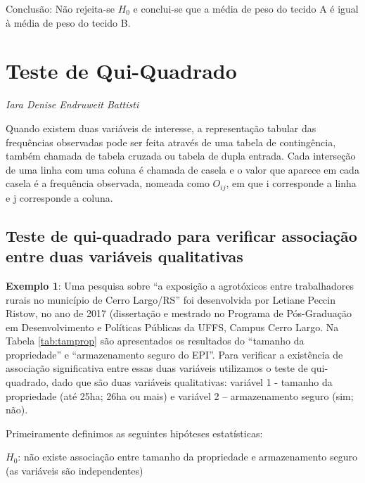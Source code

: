 \documentclass[12pt,brazil,oneside]{book}
\begin{document}
Conclusão: Não rejeita-se \(H_0\) e conclui-se que a média de peso do tecido A é igual à média de peso do tecido B.

\hypertarget{qui}{%
\chapter{Teste de Qui-Quadrado}\label{qui}}

\emph{Iara Denise Endruweit Battisti}

\begin{flushright}
\emph{}
\end{flushright}

Quando existem duas variáveis de interesse, a representação tabular das frequências observadas pode ser feita através de uma tabela de contingência, também chamada de tabela cruzada ou tabela de dupla entrada. Cada interseção de uma linha com uma coluna é chamada de casela e o valor que aparece em cada casela é a frequência observada, nomeada como \(O_{ij}\), em que i corresponde a linha e j corresponde a coluna.

\hypertarget{teste-de-qui-quadrado-para-verificar-associacao-entre-duas-variaveis-qualitativas}{%
\section{Teste de qui-quadrado para verificar associação entre duas variáveis qualitativas}\label{teste-de-qui-quadrado-para-verificar-associacao-entre-duas-variaveis-qualitativas}}

\textbf{Exemplo 1}: Uma pesquisa sobre ``a exposição a agrotóxicos entre trabalhadores rurais no município de Cerro Largo/RS'' foi desenvolvida por Letiane Peccin Ristow, no ano de 2017 (dissertação e mestrado no Programa de Pós-Graduação em Desenvolvimento e Políticas Públicas da UFFS, Campus Cerro Largo. Na Tabela \ref{tab:tamprop} são apresentados os resultados do ``tamanho da propriedade'' e ``armazenamento seguro do EPI''. Para verificar a existência de associação significativa entre essas duas variáveis utilizamos o teste de qui-quadrado, dado que são duas variáveis qualitativas: variável 1 - tamanho da propriedade (até 25ha; 26ha ou mais) e variável 2 -- armazenamento seguro (sim; não).

Primeiramente definimos as seguintes hipóteses estatísticas:

\(H_0\): não existe associação entre tamanho da propriedade e armazenamento seguro (as variáveis são independentes)
\end{document}
